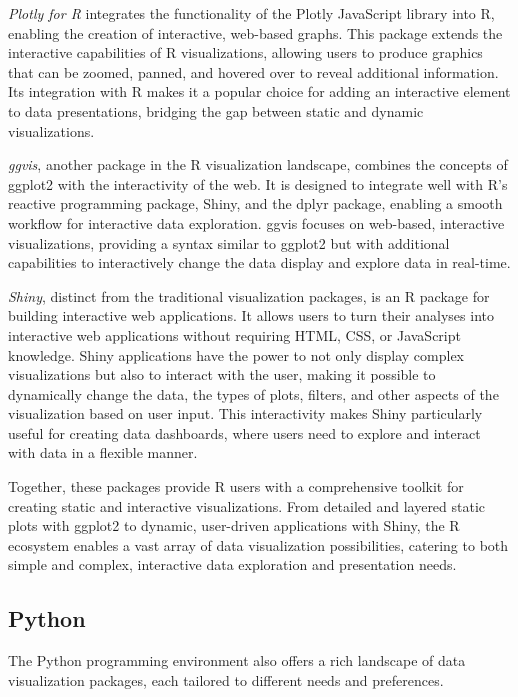 \emph{Plotly for R} integrates the functionality of the Plotly JavaScript library into R, enabling the creation of interactive, web-based graphs. This package extends the interactive capabilities of R visualizations, allowing users to produce graphics that can be zoomed, panned, and hovered over to reveal additional information. Its integration with R makes it a popular choice for adding an interactive element to data presentations, bridging the gap between static and dynamic visualizations.

\emph{ggvis}, another package in the R visualization landscape, combines the concepts of ggplot2 with the interactivity of the web. It is designed to integrate well with R's reactive programming package, Shiny, and the dplyr package, enabling a smooth workflow for interactive data exploration. ggvis focuses on web-based, interactive visualizations, providing a syntax similar to ggplot2 but with additional capabilities to interactively change the data display and explore data in real-time.

\emph{Shiny}, distinct from the traditional visualization packages, is an R package for building interactive web applications. It allows users to turn their analyses into interactive web applications without requiring HTML, CSS, or JavaScript knowledge. Shiny applications have the power to not only display complex visualizations but also to interact with the user, making it possible to dynamically change the data, the types of plots, filters, and other aspects of the visualization based on user input. This interactivity makes Shiny particularly useful for creating data dashboards, where users need to explore and interact with data in a flexible manner.

Together, these packages provide R users with a comprehensive toolkit for creating static and interactive visualizations. From detailed and layered static plots with ggplot2 to dynamic, user-driven applications with Shiny, the R ecosystem enables a vast array of data visualization possibilities, catering to both simple and complex, interactive data exploration and presentation needs.

\subsection*{Python}

The Python programming environment also offers a rich landscape of data visualization packages, each tailored to different needs and preferences.

